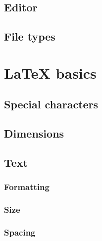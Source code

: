     \subsection{Editor}
    \label{sec:tutorial/overleaf/edit}
    
    
    \subsection{File types}
    \label{sec:tutorial/overleaf/file}
    

\newpage
\section{\LaTeX{} basics}
\label{sec:tutorial/latex}


    \subsection{Special characters}
    \label{sec:tutorial/latex/char}
    
    
    \subsection{Dimensions}
    \label{sec:tutorial/latex/dim}
    

    \subsection{Text}
    \label{sec:tutorial/latex/text}
    
    
        \subsubsection{Formatting}
        \label{sec:tutorial/latex/text/format}
        
        
        \subsubsection{Size}
        \label{sec:tutorial/latex/text/size}
        
        
        \subsubsection{Spacing}
        \label{sec:tutorial/latex/text/spacing}
        

